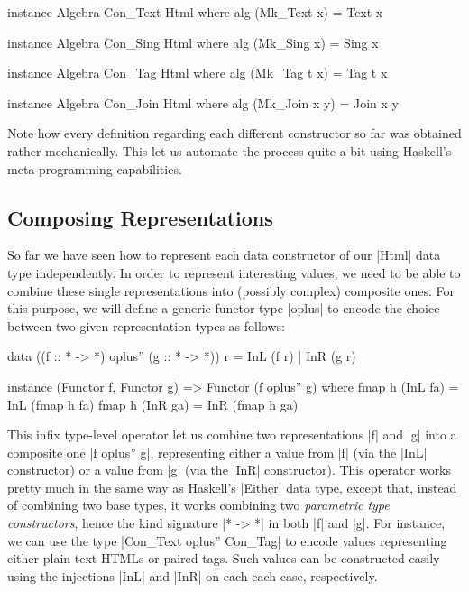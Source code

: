 \begin{code}
instance Algebra Con_Text Html where
  alg (Mk_Text x) = Text x

instance Algebra Con_Sing Html where
  alg (Mk_Sing x) = Sing x

instance Algebra Con_Tag Html where
  alg (Mk_Tag t x) = Tag t x

instance Algebra Con_Join Html where
  alg (Mk_Join x y) = Join x y
\end{code}
%
Note how every definition regarding each different constructor so far was
obtained rather mechanically.
%
This let us automate the process quite a bit using Haskell's meta-programming
capabilities.


%
\subsection{Composing Representations}

So far we have seen how to represent each data constructor of our |Html| data
type independently.
%
In order to represent interesting values, we need to be able to combine these
single representations into (possibly complex) composite ones.
%
For this purpose, we will define a generic functor type |oplus| to encode the
choice between two given representation types as follows:

\begin{code}
data ((f :: * -> *) oplus'' (g :: * -> *)) r = InL (f r) | InR (g r)

instance (Functor f, Functor g) => Functor (f oplus'' g)
  where  fmap h (InL fa) = InL (fmap h fa)
         fmap h (InR ga) = InR (fmap h ga)

\end{code}
%
This infix type-level operator let us combine two representations |f| and |g|
into a composite one |f oplus'' g|, representing either a value from |f| (via
the |InL| constructor) or a value from |g| (via the |InR| constructor).
%
This operator works pretty much in the same way as Haskell's |Either| data type,
except that, instead of combining two base types, it works combining two
\emph{parametric type constructors}, hence the kind signature |* -> *| in both
|f| and |g|.
%
For instance, we can use the type |Con_Text oplus'' Con_Tag| to encode values
representing either plain text HTMLs or paired tags.
%
Such values can be constructed easily using the injections |InL| and |InR| on
each each case, respectively.


